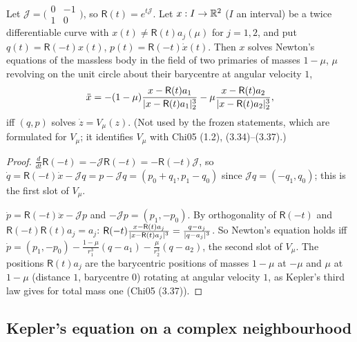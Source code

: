 \begin{lemma}\label{bpI:p7:newton}
Let $\mathcal J=\bigl(\begin{smallmatrix}0&-1\\1&0\end{smallmatrix}\bigr)$, so $\mathsf R(t)=e^{t\mathcal J}$. Let $x:I\to\mathbb{R}^2$ ($I$ an interval) be a twice differentiable curve with $x(t)\ne\mathsf R(t)a_j(\mu)$ for $j=1,2$, and put
$q(t)=\mathsf R(-t)x(t)$, $p(t)=\mathsf R(-t)\dot x(t)$. Then $x$ solves Newton's equations of the massless body in the field of two primaries of masses $1-\mu$, $\mu$ revolving on the unit circle about their barycentre at angular velocity $1$,
\[
\ddot x=-(1-\mu)\frac{x-\mathsf R(t)a_1}{\lvert x-\mathsf R(t)a_1\rvert_2^3}-\mu\frac{x-\mathsf R(t)a_2}{\lvert x-\mathsf R(t)a_2\rvert_2^3},
\]
iff $(q,p)$ solves $\dot z=V_\mu(z)$. (Not used by the frozen statements, which are formulated for $V_\mu$; it identifies $V_\mu$ with Chi05 (1.2), (3.34)--(3.37).)
\end{lemma}
\begin{proof}
\label{stepI:p7:nw-rot} $\frac d{dt}\mathsf R(-t)=-\mathcal J\mathsf R(-t)=-\mathsf R(-t)\mathcal J$, so $\dot q=\mathsf R(-t)\dot x-\mathcal Jq=p-\mathcal Jq=(p_0+q_1,p_1-q_0)$ since $\mathcal Jq=(-q_1,q_0)$; this is the first slot of $V_\mu$.

\label{stepI:p7:nw-force} $\dot p=\mathsf R(-t)\ddot x-\mathcal Jp$ and $-\mathcal Jp=(p_1,-p_0)$. By orthogonality of $\mathsf R(-t)$ and $\mathsf R(-t)\mathsf R(t)a_j=a_j$: $\mathsf R(-t)\frac{x-\mathsf R(t)a_j}{\lvert x-\mathsf R(t)a_j\rvert^3}=\frac{q-a_j}{\lvert q-a_j\rvert^3}$. So Newton's equation holds iff $\dot p=(p_1,-p_0)-\frac{1-\mu}{r_1^3}(q-a_1)-\frac\mu{r_2^3}(q-a_2)$, the second slot of $V_\mu$.
The positions $\mathsf R(t)a_j$ are the barycentric positions of masses $1-\mu$ at $-\mu$ and $\mu$ at $1-\mu$ (distance $1$, barycentre $0$) rotating at angular velocity $1$, as Kepler's third law gives for total mass one (Chi05 (3.37)).
\end{proof}

\subsection{Kepler's equation on a complex neighbourhood}\label{bpI:p7:sec-keq}

